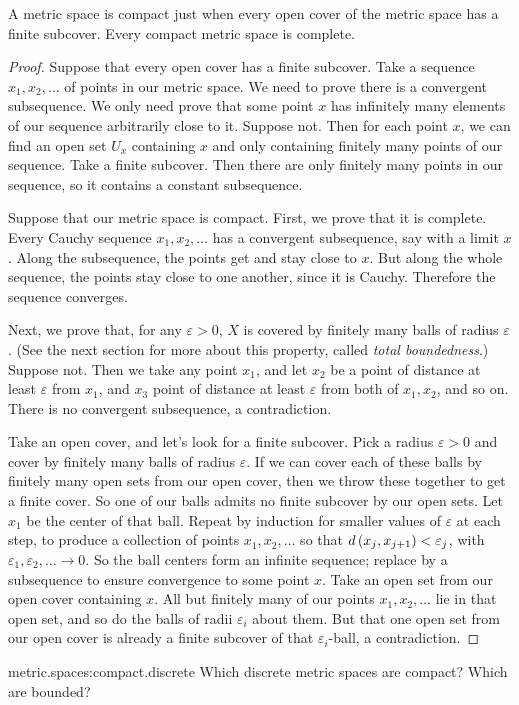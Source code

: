 \begin{theorem}\label{theorem:HB.naive}
A metric space is compact just when every open cover of the metric space has a finite subcover.
Every compact metric space is complete.
\end{theorem}
\begin{proof}
Suppose that every open cover has a finite subcover.
Take a sequence \(x_1, x_2, \dots\) of points in our metric space.
We need to prove there is a convergent subsequence.
We only need prove that some point \(x\) has infinitely many elements of our sequence arbitrarily close to it.
Suppose not.
Then for each point \(x\), we can find an open set \(U_x\) containing \(x\) and only containing finitely many points of our sequence.
Take a finite subcover.
Then there are only finitely many points in our sequence, so it contains a constant subsequence.

Suppose that our metric space is compact.
First, we prove that it is complete.
Every Cauchy sequence \(x_1,x_2,\dots\) has a convergent subsequence, say with a limit \(x\).
Along the subsequence, the points get and stay close to \(x\).
But along the whole sequence, the points stay close to one another, since it is Cauchy.
Therefore the sequence converges.

Next, we prove that, for any \(\varepsilon > 0\), \(X\) is covered by finitely many balls of radius \(\varepsilon\).
(See the next section for more about this property, called \emph{total boundedness}.)
Suppose not.
Then we take any point \(x_1\), and let \(x_2\) be a point of distance at least \(\varepsilon\) from \(x_1\), and \(x_3\)  point of distance at least \(\varepsilon\) from both of \(x_1, x_2\), and so on.
There is no convergent subsequence, a contradiction.

Take an open cover, and let's look for a finite subcover.
Pick a radius \(\varepsilon>0\) and cover by finitely many balls of radius \(\varepsilon\).
If we can cover each of these balls by finitely many open sets from our open cover, then we throw these together to get a finite cover.
So one of our balls admits no finite subcover by our open sets.
Let \(x_1\) be the center of that ball.
Repeat by induction for smaller values of \(\varepsilon\) at each step, to produce a collection of points \(x_1, x_2, \dots\) so that \(d\left(x_j,x_{j+1}\right)<\varepsilon_j\), with \(\varepsilon_1, \varepsilon_2, \dots \to 0\).
So the ball centers form an infinite sequence; replace by a subsequence to ensure convergence to some point \(x\).
Take an open set from our open cover containing \(x\).
All but finitely many of our points \(x_1, x_2, \dots\) lie in that open set, and so do the balls of radii \(\varepsilon_i\) about them.
But that one open set from our open cover is already a finite subcover of that \(\varepsilon_i\)-ball, a contradiction.
\end{proof}
\begin{problem}{metric.spaces:compact.discrete}
Which discrete metric spaces are compact?
Which are bounded?
\end{problem}

